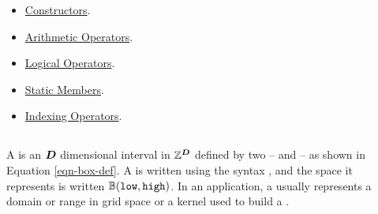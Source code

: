 \documentclass[12pt]{article}
\begin{document}
\begin{itemize}
\item
\underline{Constructors}.
\item
\underline{Arithmetic Operators}.
\item
\underline{Logical Operators}.
\item
\underline{Static Members}.
\item
\underline{Indexing Operators}.
\end{itemize}
%
%
%
%

\subsection{}

A  is an ${\boldsymbol{D}}$ dimensional interval in $\mathbb{Z}^{{\boldsymbol{D}}}$ defined by two  --  and  -- as shown in Equation \ref{eqn-box-def}. A  is written using the syntax , and the space it represents is written $\mathbb{B}(\texttt{low}, \texttt{high})$. In an application, a  usually represents a domain or range in grid space or a kernel used to build a .  
\end{document}
